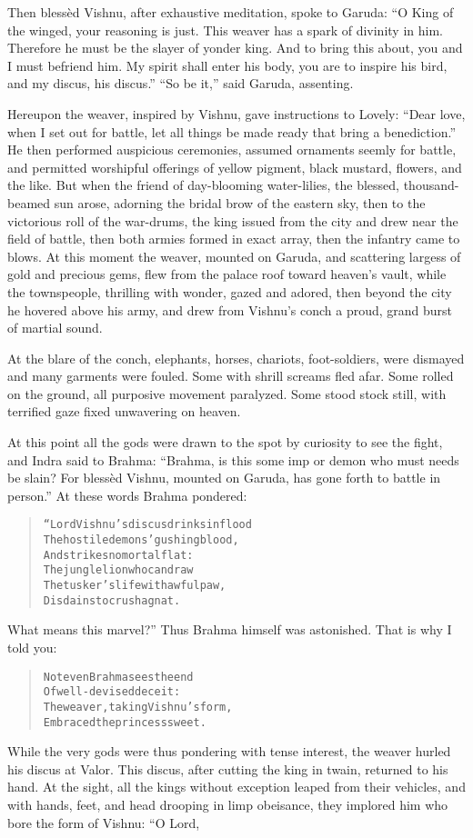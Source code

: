 \documentclass[article, twoside, 14pt]{memoir}
\renewenvironment{verbatim}{%
\begin{quote}%
\vskip -10pt%
\begin{alltt}\normalfont\large}{\end{alltt}%
\end{quote}%
\vskip -10pt
} %
\begin{document}
Then blessèd Vishnu, after exhaustive meditation, spoke to Garuda:
``O King of the winged, your reasoning is just. This weaver has a spark of divinity in him. Therefore he must be the slayer of yonder king. And to bring this about, you and I must befriend him. My spirit shall enter his body, you are to inspire his bird, and my discus, his discus.''
``So be it,'' said Garuda, assenting.

Hereupon the weaver, inspired by Vishnu, gave instructions to
Lovely:
``Dear love, when I set out for battle, let all things be made ready that bring a benediction.''
He then performed auspicious ceremonies, assumed ornaments seemly
for battle, and permitted worshipful offerings of yellow pigment,
black mustard, flowers, and the like. But when the friend of
day-blooming water-lilies, the blessed, thousand-beamed sun arose,
adorning the bridal brow of the eastern sky, then to the victorious
roll of the war-drums, the king issued from the city and drew near
the field of battle, then both armies formed in exact array, then
the infantry came to blows. At this moment the weaver, mounted on
Garuda, and scattering largess of gold and precious gems, flew from
the palace roof toward heaven's vault, while the townspeople,
thrilling with wonder, gazed and adored, then beyond the city he
hovered above his army, and drew from Vishnu's conch a proud, grand
burst of martial sound.

At the blare of the conch, elephants, horses, chariots,
foot-soldiers, were dismayed and many garments were fouled. Some
with shrill screams fled afar. Some rolled on the ground, all
purposive movement paralyzed. Some stood stock still, with
terrified gaze fixed unwavering on heaven.

At this point all the gods were drawn to the spot by curiosity to
see the fight, and Indra said to Brahma:
``Brahma, is this some imp or demon who must needs be slain? For blessèd Vishnu, mounted on Garuda, has gone forth to battle in person.''
At these words Brahma pondered:

\begin{verbatim}
“Lord Vishnu's discus drinks in flood
The hostile demons' gushing blood,
    And strikes no mortal flat:
The jungle lion who can draw
The tusker's life with awful paw,
    Disdains to crush a gnat.
\end{verbatim}
What means this marvel?” Thus Brahma himself was astonished.
That is why I told you:

\begin{verbatim}
Not even Brahma sees the end
    Of well-devised deceit:
The weaver, taking Vishnu's form,
    Embraced the princess sweet.
\end{verbatim}
While the very gods were thus pondering with tense interest, the
weaver hurled his discus at Valor. This discus, after cutting the
king in twain, returned to his hand. At the sight, all the kings
without exception leaped from their vehicles, and with hands, feet,
and head drooping in limp obeisance, they implored him who bore the
form of Vishnu: “O Lord,
\end{document}
